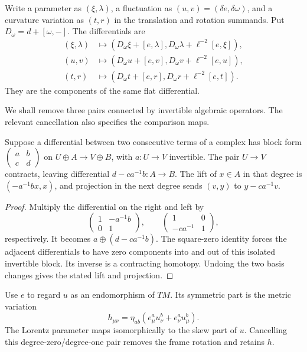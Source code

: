 Write a parameter as $(\xi,\lambda)$, a fluctuation as
$(u,v)=(\delta e,\delta\omega)$, and a curvature variation as
$(t,r)$ in the translation and rotation summands.
Put $D_\omega=d+[\omega,-]$.
The differentials are
\begin{align}
 (\xi,\lambda)&\longmapsto
 (D_\omega\xi+[e,\lambda],
  D_\omega\lambda+\ell^{-2}[e,\xi]),\label{mht:eq:gravity-gauge}\\
 (u,v)&\longmapsto
 (D_\omega u+[e,v],
  D_\omega v+\ell^{-2}[e,u]),\label{mht:eq:gravity-curvature}\\
 (t,r)&\longmapsto
 (D_\omega t+[e,r],
  D_\omega r+\ell^{-2}[e,t]).\label{mht:eq:gravity-bianchi}
\end{align}
They are the components of the same flat differential.

We shall remove three pairs connected by invertible algebraic
operators. The relevant cancellation also specifies the comparison
maps.

\begin{lemma}\label{mht:lem:gravity-cancellation}
Suppose a differential between two consecutive terms of a complex
has block form
$\left(\begin{smallmatrix}a&b\\c&d\end{smallmatrix}\right)$
on $U\oplus A\to V\oplus B$, with $a:U\to V$ invertible.
The pair $U\to V$ contracts, leaving differential
$d-ca^{-1}b:A\to B$.
The lift of $x\in A$ in that degree is $(-a^{-1}bx,x)$,
and projection in the next degree sends $(v,y)$ to $y-ca^{-1}v$.
\end{lemma}

\begin{proof}
Multiply the differential on the right and left by
\[
 \begin{pmatrix}1&-a^{-1}b\\0&1\end{pmatrix},
 \qquad
 \begin{pmatrix}1&0\\-ca^{-1}&1\end{pmatrix},
\]
respectively. It becomes $a\oplus(d-ca^{-1}b)$.
The square-zero identity forces the adjacent differentials to have
zero components into and out of this isolated invertible block.
Its inverse is a contracting homotopy.
Undoing the two basis changes gives the stated lift and projection.
\end{proof}

Use $e$ to regard $u$ as an endomorphism of $TM$.
Its symmetric part is the metric variation
\[
 h_{\mu\nu}=\eta_{ab}
       (e^a_\mu u^b_\nu+e^a_\nu u^b_\mu).
\]
The Lorentz parameter maps isomorphically to the skew part of $u$.
Cancelling this degree-zero/degree-one pair removes the frame
rotation and retains $h$.

